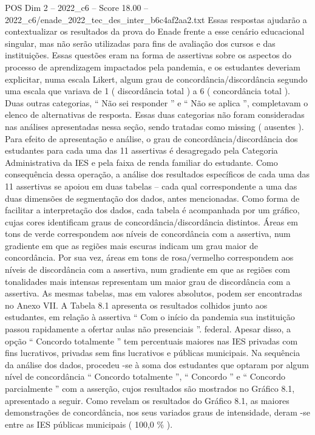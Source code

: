 \begin{textsample}{POS Dim 2 – 2022\_c6 – Score 18.00 – 2022\_c6/enade\_2022\_tec\_des\_inter\_b6c4af2aa2.txt}
Essas respostas ajudarão a contextualizar os resultados da prova do Enade frente a esse cenário educacional singular, mas não serão utilizadas para fins de avaliação dos cursos e das instituições.
Essas questões eram na forma de assertivas sobre os aspectos do processo de aprendizagem impactados pela pandemia, e os estudantes deveriam explicitar, numa escala Likert, algum grau de concordância/discordância segundo uma escala que variava de 1 ( discordância total ) a 6 ( concordância total ).
Duas outras categorias, “ Não sei responder ” e “ Não se aplica ”, completavam o elenco de alternativas de resposta.
Essas duas categorias não foram consideradas nas análises apresentadas nessa seção, sendo tratadas como missing ( ausentes ).
Para efeito de apresentação e análise, o grau de concordância/discordância dos estudantes para cada uma das 11 assertivas é desagregado pela Categoria Administrativa da IES e pela faixa de renda familiar do estudante.
Como consequência dessa operação, a análise dos resultados específicos de cada uma das 11 assertivas se apoiou em duas tabelas – cada qual correspondente a uma das duas dimensões de segmentação dos dados, antes mencionadas.
Como forma de facilitar a interpretação dos dados, cada tabela é acompanhada por um gráfico, cujas cores identificam graus de concordância/discordância distintos.
Áreas em tons de verde correspondem aos níveis de concordância com a assertiva, num gradiente em que as regiões mais escuras indicam um grau maior de concordância.
Por sua vez, áreas em tons de rosa/vermelho correspondem aos níveis de discordância com a assertiva, num gradiente em que as regiões com tonalidades mais intensas representam um maior grau de discordância com a assertiva.
As mesmas tabelas, mas em valores absolutos, podem ser encontradas no Anexo VII.
A Tabela 8.1 apresenta os resultados colhidos junto aos estudantes, em relação à assertiva “ Com o início da pandemia sua instituição passou rapidamente a ofertar aulas não presenciais ”. federal.
Apesar disso, a opção “ Concordo totalmente ” tem percentuais maiores nas IES privadas com fins lucrativos, privadas sem fins lucrativos e públicas municipais.
Na sequência da análise dos dados, procedeu -se à soma dos estudantes que optaram por algum nível de concordância “ Concordo totalmente ”, “ Concordo ” e “ Concordo parcialmente ” com a asserção, cujos resultados são mostrados no Gráfico 8.1, apresentado a seguir.
Como revelam os resultados do Gráfico 8.1, as maiores demonstrações de concordância, nos seus variados graus de intensidade, deram -se entre as IES públicas municipais ( 100,0 \% ).

\end{textsample}
